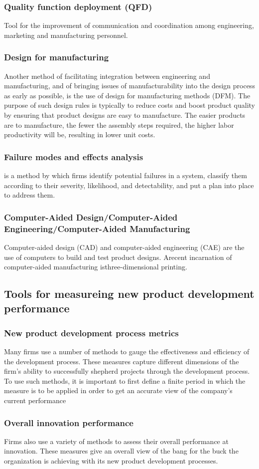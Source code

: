 \documentclass[12pt]{article}
\begin{document}
\subsubsection{Quality function deployment (QFD)}
Tool for the improvement of communication and coordination among engineering, marketing and manufacturing personnel.
\subsubsection{Design for manufacturing}
Another method of facilitating integration between engineering and manufacturing,
and of bringing issues of manufacturability into the design process as early as possible,
is the use of design for manufacturing methods (DFM).
The purpose of such design rules is typically to reduce
costs and boost product quality by ensuring that product designs are easy to manufacture. The easier products are to manufacture, the fewer the assembly steps required, the
higher labor productivity will be, resulting in lower unit costs.
\subsubsection{Failure modes and effects analysis}
is a method by which firms identify
potential failures in a system, classify them according to their severity, likelihood, and
detectability, and put a plan into place to address them.

\subsubsection{Computer-Aided Design/Computer-Aided \\  Engineering/Computer-Aided Manufacturing}
Computer-aided design (CAD) and computer-aided engineering (CAE) are the use of
computers to build and test product designs.
Arecent incarnation of computer-aided manufacturing isthree-dimensional printing.

\subsection{Tools for measureing new product development performance}
\subsubsection{New product development process metrics}
Many firms use a number of methods to gauge the effectiveness and efficiency of the
development process. These measures capture different dimensions of the firm’s ability to
successfully shepherd projects through the development process. To use such methods, it
is important to first define a finite period in which the measure is to be applied in order
to get an accurate view of the company’s current performance

\subsubsection{Overall innovation performance}
Firms also use a variety of methods to assess their overall performance at innovation.
These measures give an overall view of the bang for the buck the organization is achieving with its new product development processes.
\end{document}
